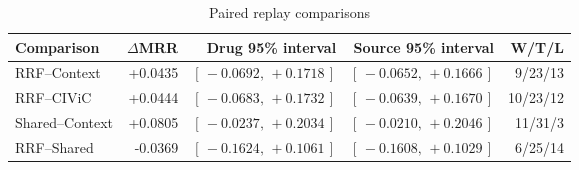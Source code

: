 \begin{table}[t]
\centering
\caption{Paired replay comparisons}
\label{tab:paired}
\small
\setlength{\tabcolsep}{2.5pt}
\begin{tabular}{lrrrr}
\toprule
Comparison & $\Delta$MRR & Drug 95\% interval & Source 95\% interval & W/T/L \\
\midrule
RRF--Context & +0.0435 & $[\,-0.0692,\,+0.1718\,]$ & $[\,-0.0652,\,+0.1666\,]$ & 9/23/13 \\
RRF--CIViC & +0.0444 & $[\,-0.0683,\,+0.1732\,]$ & $[\,-0.0639,\,+0.1670\,]$ & 10/23/12 \\
Shared--Context & +0.0805 & $[\,-0.0237,\,+0.2034\,]$ & $[\,-0.0210,\,+0.2046\,]$ & 11/31/3 \\
RRF--Shared & -0.0369 & $[\,-0.1624,\,+0.1061\,]$ & $[\,-0.1608,\,+0.1029\,]$ & 6/25/14 \\
\bottomrule
\end{tabular}
\end{table}

